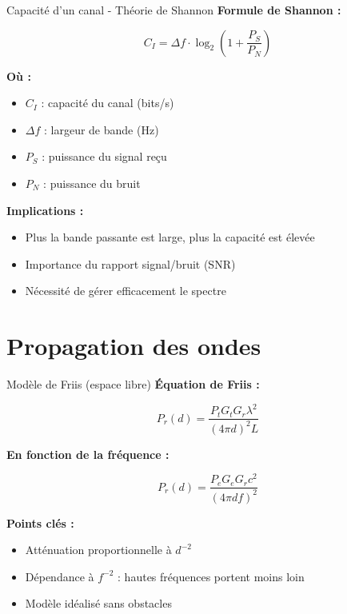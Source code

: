 \documentclass[
  ignorenonframetext,
]{beamer}
\providecommand{\tightlist}{%
  \setlength{\itemsep}{0pt}\setlength{\parskip}{0pt}}
\begin{document}
\begin{frame}{Capacité d'un canal - Théorie de Shannon}
\label{capacituxe9-dun-canal---thuxe9orie-de-shannon}
\textbf{Formule de Shannon :}

\[C_I = \Delta f \cdot \log_2 \left(1 + \frac{P_S}{P_N} \right)\]

\textbf{Où :}

\begin{itemize}
\tightlist
\item
  \(C_I\) : capacité du canal (bits/s)
\item
  \(\Delta f\) : largeur de bande (Hz)
\item
  \(P_S\) : puissance du signal reçu
\item
  \(P_N\) : puissance du bruit
\end{itemize}

\textbf{Implications :}

\begin{itemize}
\tightlist
\item
  Plus la bande passante est large, plus la capacité est élevée
\item
  Importance du rapport signal/bruit (SNR)
\item
  Nécessité de gérer efficacement le spectre
\end{itemize}
\end{frame}

\section{Propagation des ondes}\label{propagation-des-ondes}

\begin{frame}{Modèle de Friis (espace libre)}
\label{moduxe8le-de-friis-espace-libre}
\textbf{Équation de Friis :}

\[P_r(d) = \frac{P_t G_t G_r \lambda^2}{(4 \pi d)^2 L}\]

\textbf{En fonction de la fréquence :}

\[P_r(d) = \frac{P_e G_e G_r c^2}{(4 \pi d f)^2}\]

\textbf{Points clés :}

\begin{itemize}
\tightlist
\item
  Atténuation proportionnelle à \(d^{-2}\)
\item
  Dépendance à \(f^{-2}\) : hautes fréquences portent moins loin
\item
  Modèle idéalisé sans obstacles
\end{itemize}
\end{frame}
\end{document}
